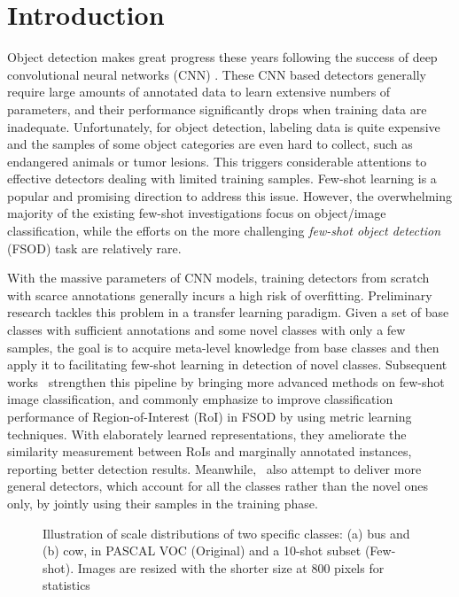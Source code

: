 \documentclass[runningheads]{llncs}
\begin{document}
\section{Introduction}

Object detection makes great progress these years following the success of deep convolutional neural networks (CNN) \cite{imagenet,resnet,fastrcnn,fasterrcnn,cascade}. 
These CNN based detectors generally require large amounts of annotated data to learn extensive numbers of parameters, and their performance significantly drops when training data are inadequate.
Unfortunately, for object detection, labeling data is quite expensive and the samples of some object categories are even hard to collect, such as endangered animals or tumor lesions. 
This triggers considerable attentions to effective detectors dealing with limited training samples.
Few-shot learning is a popular and promising direction to address this issue.
However, the overwhelming majority of the existing few-shot investigations focus on object/image classification, while the efforts on the more challenging \emph{few-shot object detection} (FSOD) task are relatively rare.

With the massive parameters of CNN models, training detectors from scratch with scarce annotations generally incurs a high risk of overfitting.
Preliminary research \cite{lstd} tackles this problem in a transfer learning paradigm. 
Given a set of base classes with sufficient annotations and some novel classes with only a few samples, the goal is to acquire meta-level knowledge from base classes and then apply it to facilitating few-shot learning in detection of novel classes.
Subsequent works~\cite{repmet,matchdet,yolore,metarcnn} strengthen this pipeline by bringing more advanced methods on few-shot image classification, and commonly emphasize to improve classification performance of  Region-of-Interest (RoI) in FSOD by using metric learning techniques. 
With elaborately learned representations, they ameliorate the similarity measurement between RoIs and marginally annotated instances, reporting better detection results.
Meanwhile,~\cite{yolore,metarcnn} also attempt to deliver more general detectors, which account for all the classes rather than the novel ones only, by jointly using their samples in the training phase.
\begin{figure}
	\centering
	\quad
	\quad
	\caption{Illustration of scale distributions of two specific classes: (a) bus and (b) cow, in PASCAL VOC (Original) and a 10-shot subset (Few-shot). Images are resized with the shorter size at 800 pixels for statistics}
	\label{fig:sds}
\end{figure}
\end{document}
